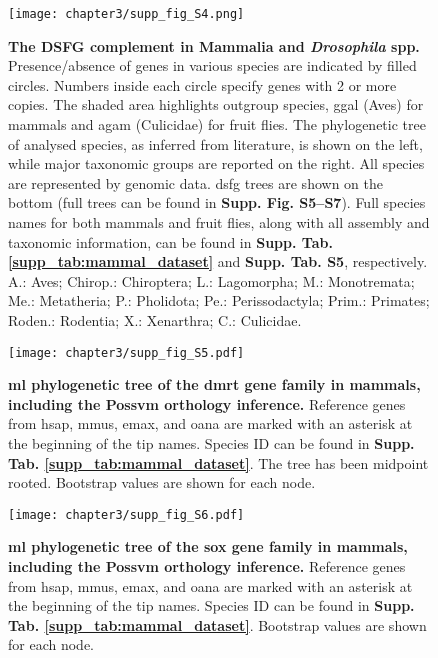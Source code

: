 \documentclass[../main.tex]{subfiles}
\begin{document}
\begin{figure}[ht]
	\centering
	\texttt{[image: chapter3/supp\_fig\_S4.png]}
	\captionsetup{width=\textwidth}
	\caption{
		\textbf{The DSFG complement in Mammalia and \textit{Drosophila} spp.} Presence/absence of genes in various species are indicated by filled circles. Numbers inside each circle specify genes with 2 or more copies. The shaded area highlights outgroup species, \gls{ggal} (Aves) for mammals and \gls{agam} (Culicidae) for fruit flies. The phylogenetic tree of analysed species, as inferred from literature, is shown on the left, while major taxonomic groups are reported on the right. All species are represented by genomic data. \gls{dsfg} trees are shown on the bottom (full trees can be found in \textbf{Supp. Fig. S5--S7}). Full species names for both mammals and fruit flies, along with all assembly and taxonomic information, can be found in \textbf{Supp. Tab. \ref{supp_tab:mammal_dataset}} and \textbf{Supp. Tab. S5}, respectively. A.: Aves; Chirop.: Chiroptera; L.: Lagomorpha; M.: Monotremata; Me.: Metatheria; P.: Pholidota; Pe.: Perissodactyla; Prim.: Primates; Roden.: Rodentia; X.: Xenarthra; C.: Culicidae.
	}
	\label{suppFig:DSFG_testCompilation}
\end{figure}

\begin{figure}[ht]
	\centering
	\texttt{[image: chapter3/supp\_fig\_S5.pdf]}
	\captionsetup{width=\textwidth}
	\caption{
		\textbf{\gls{ml} phylogenetic tree of the \gls{dmrt} gene family in mammals, including the Possvm orthology inference.} Reference genes from \gls{hsap}, \gls{mmus}, \gls{emax}, and \gls{oana} are marked with an asterisk at the beginning of the tip names. Species ID can be found in \textbf{Supp. Tab. \ref{supp_tab:mammal_dataset}}. The tree has been midpoint rooted. Bootstrap values are shown for each node.
	}
	\label{suppFig:dmrt_mammals}
\end{figure}

\begin{figure}[ht]
	\centering
	\texttt{[image: chapter3/supp\_fig\_S6.pdf]}
	\captionsetup{width=\textwidth}
	\caption{
		\textbf{\gls{ml} phylogenetic tree of the \gls{sox} gene family in mammals, including the Possvm orthology inference.} Reference genes from \gls{hsap}, \gls{mmus}, \gls{emax}, and \gls{oana} are marked with an asterisk at the beginning of the tip names. Species ID can be found in \textbf{Supp. Tab. \ref{supp_tab:mammal_dataset}}. Bootstrap values are shown for each node.
	}
	\label{suppFig:sox_mammals}
\end{figure}
\end{document}
